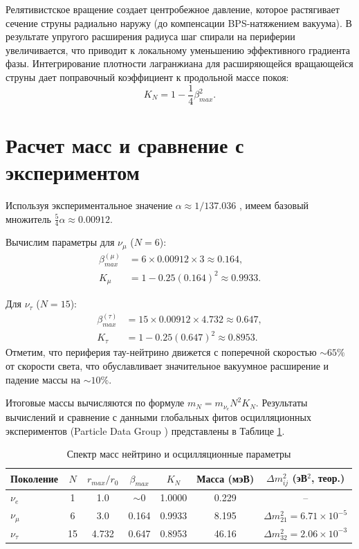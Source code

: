 \documentclass[12pt,a4paper]{article}
\begin{document}
	Релятивистское вращение создает центробежное давление, которое растягивает сечение струны радиально наружу (до компенсации BPS-натяжением вакуума). В результате упругого расширения радиуса шаг спирали на периферии увеличивается, что приводит к локальному уменьшению эффективного градиента фазы. Интегрирование плотности лагранжиана для расширяющейся вращающейся струны дает поправочный коэффициент к продольной массе покоя:
	\begin{equation}
		K_N = 1 - \frac{1}{4} \beta_{max}^2.
	\end{equation}
	
	\section{Расчет масс и сравнение с экспериментом}
	
	Используя экспериментальное значение $\alpha \approx 1/137.036$ \cite{codata2018}, имеем базовый множитель $\frac{5}{4}\alpha \approx 0.00912$. 
	
	Вычислим параметры для $\nu_\mu$ ($N=6$):
	\begin{align}
		\beta_{max}^{(\mu)} &= 6 \times 0.00912 \times 3 \approx 0.164, \\
		K_\mu &= 1 - 0.25 (0.164)^2 \approx 0.9933.
	\end{align}
	
	Для $\nu_\tau$ ($N=15$):
	\begin{align}
		\beta_{max}^{(\tau)} &= 15 \times 0.00912 \times 4.732 \approx 0.647, \\
		K_\tau &= 1 - 0.25 (0.647)^2 \approx 0.8953.
	\end{align}
	Отметим, что периферия тау-нейтрино движется с поперечной скоростью $\sim 65\%$ от скорости света, что обуславливает значительное вакуумное расширение и падение массы на $\sim 10\%$.
	
	Итоговые массы вычисляются по формуле $m_N = m_{\nu_e} N^2 K_N$. Результаты вычислений и сравнение с данными глобальных фитов осцилляционных экспериментов (Particle Data Group \cite{pdg2024}) представлены в Таблице \ref{tab:neutrino}.
	
	\begin{table}[h]
		\centering
		\caption{Спектр масс нейтрино и осцилляционные параметры}
		\label{tab:neutrino}
		\renewcommand{\arraystretch}{1.3}
		\begin{tabular}{lcccccc}
			\toprule
			Поколение & $N$ & $r_{max}/r_0$ & $\beta_{max}$ & $K_N$ & Масса (мэВ) & $\Delta m^2_{ij}$ (эВ$^2$, теор.) \\
			\midrule
			$\nu_e$   & 1   & 1.0     & $\sim 0$ & 1.0000 & 0.229 & -- \\
			$\nu_\mu$ & 6   & 3.0     & 0.164    & 0.9933 & 8.195 & $\Delta m^2_{21} = 6.71 \times 10^{-5}$ \\
			$\nu_\tau$ & 15 & 4.732   & 0.647    & 0.8953 & 46.16 & $\Delta m^2_{32} = 2.06 \times 10^{-3}$ \\
			\bottomrule
		\end{tabular}
	\end{table}
	
\end{document}
